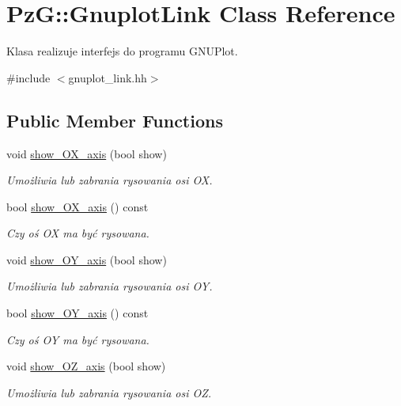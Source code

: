 \hypertarget{class_pz_g_1_1_gnuplot_link}{}\section{PzG\+:\+:Gnuplot\+Link Class Reference}
\label{class_pz_g_1_1_gnuplot_link}


Klasa realizuje interfejs do programu G\+N\+U\+Plot.  




{\ttfamily \#include $<$gnuplot\+\_\+link.\+hh$>$}

\subsection*{Public Member Functions}
\begin{DoxyCompactItemize}
\item 
void \hyperlink{class_pz_g_1_1_gnuplot_link_abd99d3a72eebe5c6323be5cf4a465b34}{show\+\_\+\+O\+X\+\_\+axis} (bool show)
\begin{DoxyCompactList}\small\item\em Umożliwia lub zabrania rysowania osi OX. \end{DoxyCompactList}\item 
bool \hyperlink{class_pz_g_1_1_gnuplot_link_a94cb61a141da389031bdaa2fd1a2f9d0}{show\+\_\+\+O\+X\+\_\+axis} () const 
\begin{DoxyCompactList}\small\item\em Czy oś OX ma być rysowana. \end{DoxyCompactList}\item 
void \hyperlink{class_pz_g_1_1_gnuplot_link_a345cd5f032c34ffcc1e3aa16438dda82}{show\+\_\+\+O\+Y\+\_\+axis} (bool show)
\begin{DoxyCompactList}\small\item\em Umożliwia lub zabrania rysowania osi OY. \end{DoxyCompactList}\item 
bool \hyperlink{class_pz_g_1_1_gnuplot_link_a7221ba30e2c2d736c9b314a0ad751823}{show\+\_\+\+O\+Y\+\_\+axis} () const 
\begin{DoxyCompactList}\small\item\em Czy oś OY ma być rysowana. \end{DoxyCompactList}\item 
void \hyperlink{class_pz_g_1_1_gnuplot_link_ab4e8078f7c63779d5f4c21f22608d3ef}{show\+\_\+\+O\+Z\+\_\+axis} (bool show)
\begin{DoxyCompactList}\small\item\em Umożliwia lub zabrania rysowania osi OZ. \end{DoxyCompactList}\item 

\end{DoxyCompactItemize}
